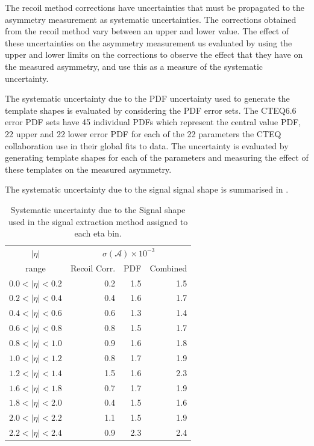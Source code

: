 The recoil method corrections have uncertainties that must be propagated to the
asymmetry measurement as systematic uncertainties.
 The corrections obtained from the recoil method vary between an
upper and lower value\cite{}. The effect of these uncertainties on the asymmetry
measurement us evaluated by using the upper and lower limits on the corrections
to observe the effect that they have on the measured asymmetry, and use this as
a measure of the systematic uncertainty.

The systematic uncertainty due to the {PDF} uncertainty used to generate the
template shapes is evaluated by considering the {PDF} error sets. The CTEQ6.6
error {PDF} sets have 45 individual PDFs
which represent the central value {PDF}, 22 upper and 22 lower error {PDF}
for each of the 22 parameters the CTEQ collaboration use in their global fits to
data.
The uncertainty is evaluated by generating template shapes for each of the
parameters and measuring the effect of these templates on the measured
asymmetry. 

The systematic uncertainty due to the signal \ETm signal shape is summarised in
.

\begin{table}[htbp]
\begin{center}
\begin{tabular}{crrr}
\toprule
$|\eta|$  & \multicolumn{3}{c}{$\sigma(\mathcal{A}) \times 10^{-3}$}\\
range     & Recoil Corr.& PDF & Combined \\
\midrule
$0.0<|\eta|<0.2$ &  0.2 &  1.5  & 1.5 \\
$0.2<|\eta|<0.4$ &  0.4 &  1.6  & 1.7 \\
$0.4<|\eta|<0.6$ &  0.6 &  1.3  & 1.4 \\
$0.6<|\eta|<0.8$ &  0.8 &  1.5  & 1.7 \\
$0.8<|\eta|<1.0$ &  0.9 &  1.6  & 1.8 \\
$1.0<|\eta|<1.2$ &  0.8 &  1.7  & 1.9 \\
$1.2<|\eta|<1.4$ &  1.5 &  1.6  & 2.3 \\
$1.6<|\eta|<1.8$ &  0.7 &  1.7  & 1.9 \\
$1.8<|\eta|<2.0$ &  0.4 &  1.5  & 1.6 \\
$2.0<|\eta|<2.2$ &  1.1 &  1.5  & 1.9 \\
$2.2<|\eta|<2.4$ &  0.9 &  2.3  & 2.4 \\
\bottomrule
\end{tabular}
\caption{\label{tab:updatedsystsig} Systematic uncertainty due to the Signal \MET shape
used in the signal extraction method assigned to each eta bin.}
\end{center}
\end{table}

